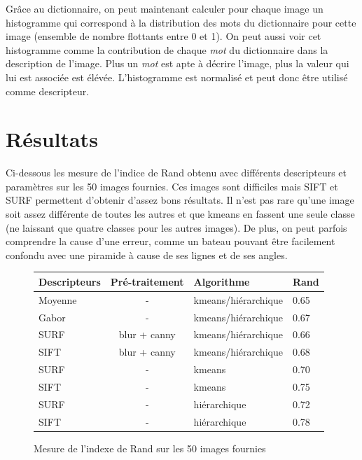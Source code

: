 \documentclass[12pt,a4paper,utf8x]{report}
\begin{document}
        Grâce au dictionnaire, on peut maintenant calculer pour chaque image un histogramme qui correspond à la distribution des mots du dictionnaire pour cette image (ensemble de nombre flottants entre 0 et 1). On peut aussi voir cet histogramme comme la contribution de chaque \textit{mot} du dictionnaire dans la description de l'image. Plus un \textit{mot} est apte à décrire l'image, plus la valeur qui lui est associée est élévée. L'histogramme est normalisé et peut donc être utilisé comme descripteur.


\chapter{Résultats}

  Ci-dessous les mesure de l'indice de Rand obtenu avec différents descripteurs et paramètres sur les 50 images fournies. Ces images sont difficiles mais SIFT et SURF permettent d'obtenir d'assez bons résultats. Il n'est pas rare qu'une image soit assez différente de toutes les autres et que kmeans en fassent une seule classe (ne laissant que quatre classes pour les autres images). De plus, on peut parfois comprendre la cause d'une erreur, comme un bateau pouvant être facilement confondu avec une piramide à cause de ses lignes et de ses angles.

  \begin{figure}[!h]
      \centering
        \begin{tabular}{ | l | c | l | l |}
          \hline
          Descripteurs & Pré-traitement & Algorithme & Rand \\
          \hline
            Moyenne & -             & kmeans/hiérarchique   & 0.65\\
            Gabor   & -             & kmeans/hiérarchique   & 0.67\\
            SURF    & blur + canny  & kmeans/hiérarchique   & 0.66\\
            SIFT    & blur + canny  & kmeans/hiérarchique   & 0.68\\
            SURF    & -             & kmeans                & 0.70\\
            SIFT    & -             & kmeans                & 0.75\\
            SURF    & -             & hiérarchique          & 0.72\\
            SIFT    & -             & hiérarchique          & 0.78\\
          \hline  
        \end{tabular}
    \caption{Mesure de l'indexe de Rand sur les 50 images fournies}
  \end{figure}
\end{document}

